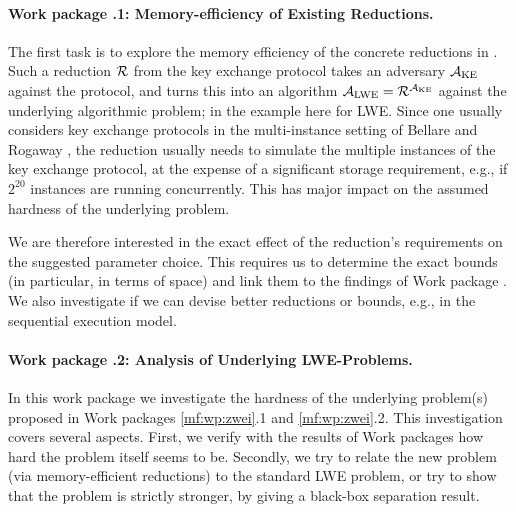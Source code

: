 \label{mf:wp:eins}

\paragraph{Work package \theworkpackage.1: Memory-efficiency of Existing Reductions.}

The first task is to explore the memory efficiency of the concrete reductions in \cite{P14,BCNS15,ADPS16,BCDMNNRS16}. Such a reduction $\mathcal{R}$ from the key exchange protocol takes an adversary $\mathcal{A}_\text{KE}$ against the protocol, and turns this into an algorithm $\mathcal{A}_\text{LWE}=\mathcal{R}^{\mathcal{A}_\text{KE}}$ against the underlying algorithmic problem; in the example here for LWE.
Since one usually considers key exchange protocols in the multi-instance setting of Bellare and Rogaway \cite{BR93}, the reduction usually needs to simulate the multiple instances of the key exchange protocol, at the expense of a significant storage requirement, e.g., if $2^{20}$ instances are running concurrently. This has major impact on the assumed hardness of the underlying problem.

We are therefore interested in the exact effect of the reduction's requirements on the suggested parameter choice. This requires us to determine the exact bounds (in particular, in terms of space) and link them to the findings of Work package . 
We also investigate if we can devise better reductions or bounds, e.g., in the sequential execution model.


\paragraph{Work package \theworkpackage.2: Analysis of Underlying LWE-Problems.}

In this work package we investigate the hardness of the underlying problem(s) proposed in Work packages {\ref{mf:wp:zwei}}.1 and \ref{mf:wp:zwei}.2. This investigation covers several aspects. First, we verify with the results of Work packages  how hard the problem itself seems to be. Secondly, we try to relate the new problem (via memory-efficient reductions) to the standard LWE problem, or try to show that the problem is strictly stronger, by giving a black-box separation result.

